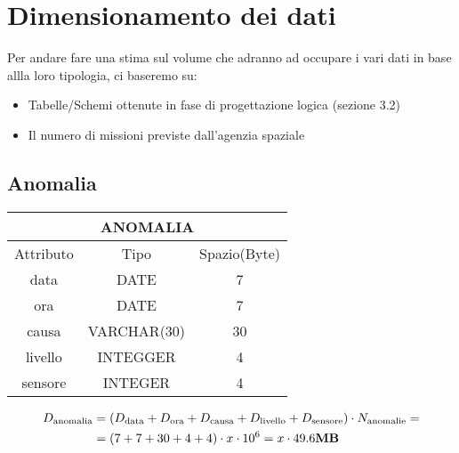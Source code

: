 \section{Dimensionamento dei dati}
Per andare fare una stima sul volume che adranno ad occupare i vari dati in base allla loro tipologia, ci baseremo su:
\begin{itemize}
\item Tabelle/Schemi ottenute in fase di progettazione logica (sezione 3.2)
\item Il numero di missioni previste dall'agenzia spaziale
\end{itemize}
\subsection{Anomalia}
\begin{tabular}{|c|c|c|}
  \hline
  \multicolumn{3}{|c|}{\textbf{ANOMALIA}}\\
  \hline
  Attributo & Tipo & Spazio(Byte) \\
  \hline
  data & DATE & 7 \\
  ora & DATE & 7 \\
  causa & VARCHAR(30) & 30 \\
  livello & INTEGGER & 4 \\
  sensore & INTEGER & 4 \\
  \hline
\end{tabular}
\begin{equation}
  \begin{aligned}
    D_{\text{anomalia}}&=(D_{\text{data}} + D_{\text{ora}} +D_{\text{causa}} +D_{\text{livello}} + D_{\text{sensore}}) \cdot N_{\text{anomalie}}=\\
    &=(7+7+30+4+4)\cdot x\cdot 10^6=x\cdot 49.6  \text{\textbf{MB}}\\
  \end{aligned}
\end{equation}
